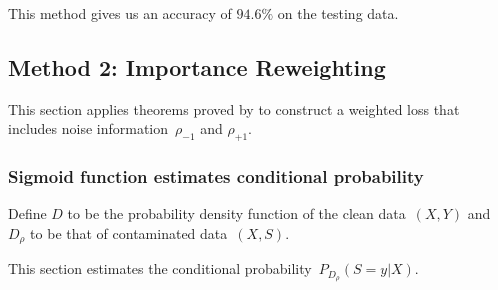 \documentclass[12pt]{article} %
\newcommand{\rhoo}{\rho_{+1}}
\newcommand{\rhoz}{\rho_{-1}}
\begin{document}




This method gives us an accuracy of $94.6\%$ on the testing data.


\subsection{Method 2: Importance Reweighting} \label{3rd}
This section applies theorems proved by \citet{liu2016classification} to construct a weighted loss that includes noise information~$\rhoz$ and $\rhoo$.

\subsubsection{Sigmoid function estimates conditional probability}\label{sigmoid}
Define $D$ to be the probability density function of the clean data~$(X,Y)$ and $D_\rho$ to be that of contaminated data~$(X,S)$.

This section estimates the conditional probability~$P_{D_\rho}(S=y|X)$.
\end{document}
